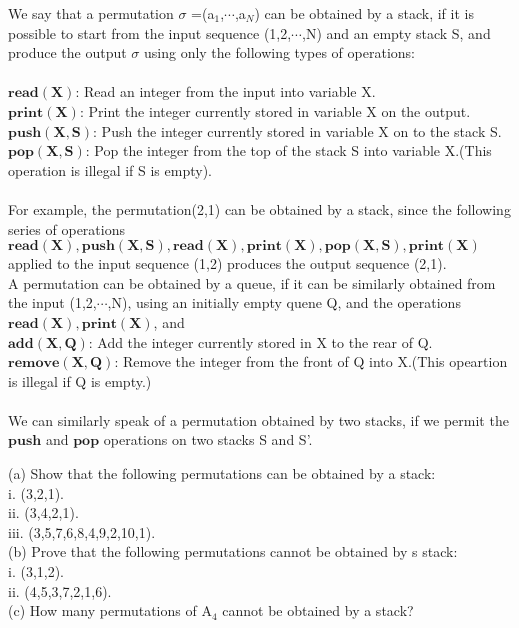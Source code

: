 \documentclass[11pt, a4paper, UTF8]{ctexart}
\begin{document}
\begin{problem}[DH:2.12]
We say that a permutation $\sigma$ =(a$_1$,$\cdots$,a$_N$) can be obtained by a stack, if it is possible to start from the input sequence (1,2,$\cdots$,N) and an empty stack S, and produce the output $\sigma$ using only the following types of operations:\\
\\
$\boldsymbol{read(X)}$: Read an integer from the input into variable X.\\
$\boldsymbol{print(X)}$: Print the integer currently stored in variable X on the output.\\
$\boldsymbol{push(X,S)}$: Push the integer currently stored in variable X on to the stack S.\\
$\boldsymbol{pop(X,S)}$: Pop the integer from the top of the stack S into variable X.(This operation is illegal if S is empty).\\
\\
For example, the permutation(2,1) can be obtained by a stack, since the following series of operations\\
\indent \noindent $\boldsymbol{read(X), push(X,S), read(X), print(X), pop(X,S), print(X)}$\\
applied to the input sequence (1,2) produces the output sequence (2,1).\\
\indent \noindent A permutation can be obtained by a queue, if it can be similarly obtained from the input (1,2,$\cdots$,N), using an initially empty quene Q, and the operations $\boldsymbol{read(X), print(X)}$, and\\
\indent \noindent $\boldsymbol{add(X,Q)}$: Add the integer currently stored in X to the rear of Q.\\
\indent \noindent $\boldsymbol{remove(X,Q)}$: Remove the integer from the front of Q into X.(This opeartion is illegal if Q is empty.)\\
\\
We can similarly speak of a permutation obtained by two stacks, if we permit the $\boldsymbol{push}$ and $\boldsymbol{pop}$ operations on two stacks S and S'.

(a) Show that the following permutations can be obtained by a stack:\\
\indent \noindent  i. (3,2,1).\\
\indent \noindent ii. (3,4,2,1).\\
\indent \noindent iii. (3,5,7,6,8,4,9,2,10,1).\\
(b) Prove that the following permutations cannot be obtained by s stack:\\
\indent \noindent i. (3,1,2).\\
\indent \noindent ii. (4,5,3,7,2,1,6).\\
(c) How many permutations of A$_4$ cannot be obtained by a stack?\\
\end{problem}
\end{document}
